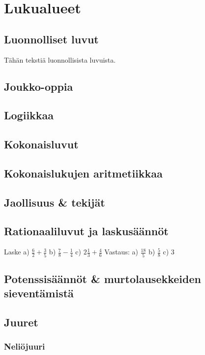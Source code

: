 


\part{Lukualueet}
\chapter{Luonnolliset luvut}

Tähän tekstiä luonnollisista luvuista.

\chapter{Joukko-oppia}
\chapter{Logiikkaa}
\chapter{Kokonaisluvut}
\chapter{Kokonaislukujen aritmetiikkaa}
\chapter{Jaollisuus \& tekijät}
\chapter{Rationaaliluvut ja laskusäännöt}

Laske %
a) $\frac{6}{2} + \frac{3}{5}$
b) $\frac{7}{8} - \frac{1}{4}$
c) $2 \frac{1}{3} + \frac{4}{6}$
Vastaus:
a) $\frac{18}{5}$
b) $\frac{5}{8}$
c) $3$

\chapter{Potenssisäännöt \& murtolausekkeiden sieventämistä}
\chapter{Juuret}

\section{Neliöjuuri}


